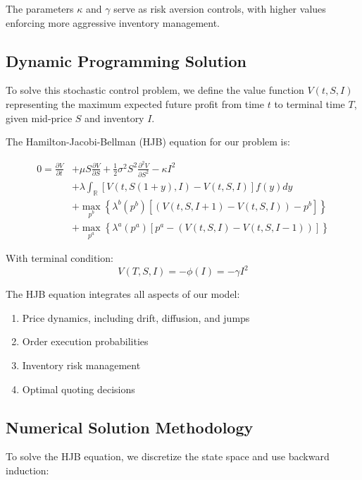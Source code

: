 \documentclass[twocolumn,ieee]{arithmaxresearch}
\begin{document}
\begin{onecolumn}
The parameters $\kappa$ and $\gamma$ serve as risk aversion controls, with higher values enforcing more aggressive inventory management.

\subsection{Dynamic Programming Solution}

To solve this stochastic control problem, we define the value function $V(t, S, I)$ representing the maximum expected future profit from time $t$ to terminal time $T$, given mid-price $S$ and inventory $I$.

The Hamilton-Jacobi-Bellman (HJB) equation for our problem is:

\begin{equation}
\begin{aligned}
0 = \frac{\partial V}{\partial t} &+ \mu S \frac{\partial V}{\partial S} + \frac{1}{2}\sigma^2 S^2 \frac{\partial^2 V}{\partial S^2} - \kappa I^2 \\
&+ \lambda \int_{\mathbb{R}} \left[V(t, S(1+y), I) - V(t, S, I)\right] f(y) dy \\
&+ \max_{p^b} \left\{\lambda^b(p^b) \left[(V(t,S,I+1) - V(t,S,I)) - p^b\right]\right\} \\
&+ \max_{p^a} \left\{\lambda^a(p^a) \left[p^a - (V(t,S,I) - V(t,S,I-1))\right]\right\}
\end{aligned}
\end{equation}

With terminal condition:
\begin{equation}
V(T,S,I) = -\phi(I) = -\gamma I^2
\end{equation}

The HJB equation integrates all aspects of our model:
\begin{enumerate}
    \item Price dynamics, including drift, diffusion, and jumps
    \item Order execution probabilities
    \item Inventory risk management
    \item Optimal quoting decisions
\end{enumerate}

\subsection{Numerical Solution Methodology}

To solve the HJB equation, we discretize the state space and use backward induction:


\end{onecolumn}
\end{document}
